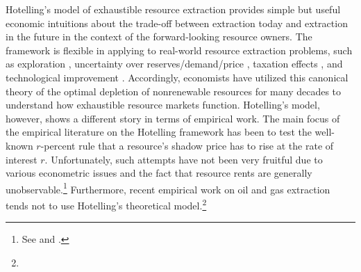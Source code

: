 Hotelling's model of exhaustible resource extraction provides simple but useful economic intuitions about the trade-off between extraction today and extraction in the future in the context of the forward-looking resource owners. The framework is flexible in applying to real-world resource extraction problems, such as exploration \citep{The-Optimal-Exploration-and-Production-of-Nonrenewable-Resources_Pindyck_1978, Optimal-Pricing-Use-and-Exploration-of-Uncertain-Natural-Resource-Stocks_Arrow-and-Chang_1982, Exploration-and-Exhaustible-Resources_The-Microfoundations-of-Aggregate-Models_Swierzbinski-and-Mendelsohn_1989, Exhaustible-Resources_A-Theory-of-Exploration_Quyen_1991}, uncertainty over reserves/demand/price \citep{Optimal-Depletion-of-an-Uncertain-Stock_Gilber_1979, Uncertainty-and-Exhaustible-Resource-Markets_Pindyck_1980, The-Optimal-Production-of-an-Exhaustible-Resource-When-Price-is-Exogenous-and-Stochastic_Pindyck_1981, Extraction-at-the-Intensive-Margin_Farrow-and-Krautkraemer_1989}, taxation effects \citep{Economics-of-Depletatble-Resources_Market-Forces-and-Intertemporal-Bias_Sweeney_1977, The-Taxation-of-Nonreplenishable-Natural-Resources-Revisited_Heaps_1985}, and technological improvement \citep{Growth-with-Exhaustible-Natural-Resources_Efficient-and-Optimal-Growth-Paths_Stiglitz_1974, Trends-in-Natural-Resource-Commodity-Prices_An-Analysis-of-the-Time-Domain_Slade_1982}. Accordingly, economists have utilized this canonical theory of the optimal depletion of nonrenewable resources for many decades to understand how exhaustible resource markets function. Hotelling's model, however, shows a different story in terms of empirical work. The main focus of the empirical literature on the Hotelling framework has been to test the well-known $r$-percent rule that a resource's shadow price has to rise at the rate of interest $r$. Unfortunately, such attempts have not been very fruitful due to various econometric issues and the fact that resource rents are generally unobservable.\footnote{See \cite{Natural-Resource-Economics-under-the-Rule-of-Hotelling_Gaudet_2007} and \cite{Whither-Hotelling-Tests-of-the-Theory-of-Exhaustible-Resources_Slade-and-Thille_2009}.} Furthermore, recent empirical work on oil and gas extraction tends not to use Hotelling's theoretical model.\footnote{
}
